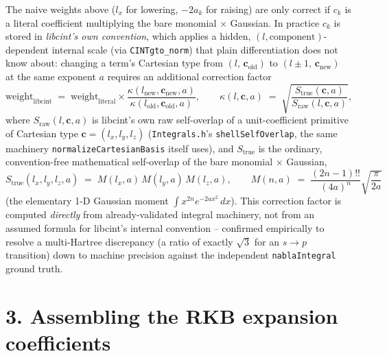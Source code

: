 \documentclass[11pt]{article}
\newcommand{\bs}[1]{\boldsymbol{#1}}
\begin{document}
The naive weights above ($l_x$ for lowering, $-2a_k$ for raising) are only correct if $c_k$ is a
literal coefficient multiplying the bare monomial $\times$ Gaussian. In practice $c_k$ is stored in
\emph{libcint's own convention}, which applies a hidden, $(l,\text{component})$-dependent internal
scale (via \texttt{CINTgto\_norm}) that plain differentiation does not know about: changing a
term's Cartesian type from $(l,\,\bs c_{\text{old}})$ to $(l\pm1,\,\bs c_{\text{new}})$ at the same
exponent $a$ requires an additional correction factor
\begin{equation}
\text{weight}_{\text{libcint}} \;=\; \text{weight}_{\text{literal}}\times
\frac{\kappa(l_{\text{new}},\bs c_{\text{new}},a)}{\kappa(l_{\text{old}},\bs c_{\text{old}},a)},
\qquad
\kappa(l,\bs c,a) \;=\; \sqrt{\dfrac{S_{\text{true}}(\bs c,a)}{S_{\text{raw}}(l,\bs c,a)}},
\end{equation}
where $S_{\text{raw}}(l,\bs c,a)$ is libcint's own raw self-overlap of a unit-coefficient primitive
of Cartesian type $\bs c=(l_x,l_y,l_z)$ (\texttt{Integrals.h}'s \texttt{shellSelfOverlap}, the same
machinery \texttt{normalizeCartesianBasis} itself uses), and $S_{\text{true}}$ is the ordinary,
convention-free mathematical self-overlap of the bare monomial $\times$ Gaussian,
\begin{equation}
S_{\text{true}}(l_x,l_y,l_z,a) \;=\; M(l_x,a)\,M(l_y,a)\,M(l_z,a),
\qquad
M(n,a) \;=\; \frac{(2n-1)!!}{(4a)^n}\sqrt{\frac{\pi}{2a}}
\end{equation}
(the elementary 1-D Gaussian moment $\int x^{2n} e^{-2ax^2}\,dx$). This correction factor is
computed \emph{directly} from already-validated integral machinery, not from an assumed formula
for libcint's internal convention -- confirmed empirically to resolve a multi-Hartree discrepancy
(a ratio of exactly $\sqrt3$ for an $s\!\to\!p$ transition) down to machine precision against the
independent \texttt{nablaIntegral} ground truth.

\section*{3. Assembling the RKB expansion coefficients}
\end{document}
